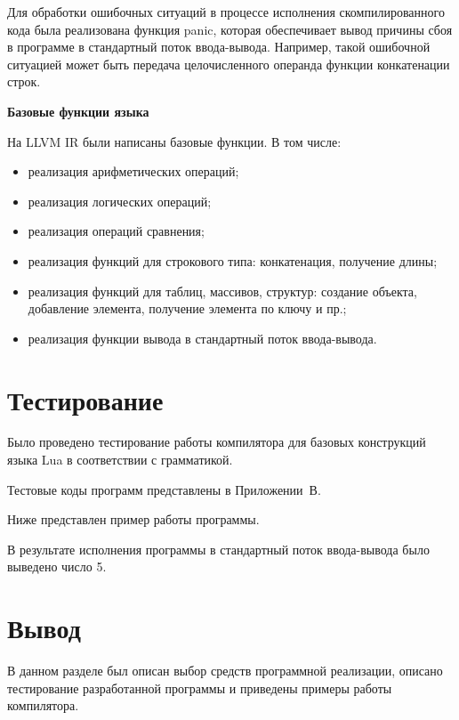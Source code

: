 Для обработки ошибочных ситуаций в процессе исполнения скомпилированного кода была реализована функция panic, которая обеспечивает вывод причины сбоя в программе в стандартный поток ввода-вывода. 
Например, такой ошибочной ситуацией может быть передача целочисленного операнда функции конкатенации строк.


\textbf{Базовые функции языка}

На LLVM IR были написаны базовые функции. В том числе:
\begin{itemize}
	\item реализация арифметических операций;
	\item реализация логических операций;
	\item реализация операций сравнения;
	\item реализация функций для строкового типа: конкатенация, получение длины;
	\item реализация функций для таблиц, массивов, структур: создание объекта, добавление элемента, получение элемента по ключу и пр.;
	\item реализация функции вывода в стандартный поток ввода-вывода.
\end{itemize} 

\section{Тестирование}

Было проведено тестирование работы компилятора для базовых конструкций языка Lua в соответствии с грамматикой.

Тестовые коды программ представлены в Приложении~В.

Ниже представлен пример работы программы.



В результате исполнения программы в стандартный поток ввода-вывода было выведено число 5.

\section{Вывод}
В данном разделе был описан выбор средств программной реализации, описано тестирование разработанной программы и приведены примеры работы компилятора.







